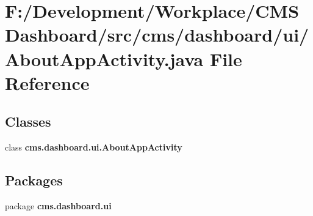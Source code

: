 \section{\-F\-:/\-Development/\-Workplace/\-C\-M\-S \-Dashboard/src/cms/dashboard/ui/\-About\-App\-Activity.java \-File \-Reference}
\label{_about_app_activity_8java}
\subsection*{\-Classes}
\begin{DoxyCompactItemize}
\item 
class {\bf cms.\-dashboard.\-ui.\-About\-App\-Activity}
\end{DoxyCompactItemize}
\subsection*{\-Packages}
\begin{DoxyCompactItemize}
\item 
package {\bf cms.\-dashboard.\-ui}
\end{DoxyCompactItemize}
